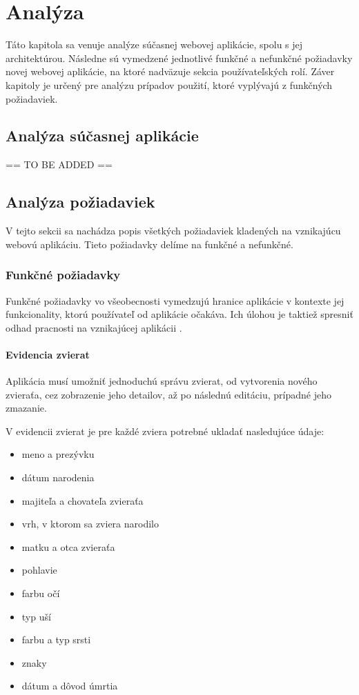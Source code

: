 \chapter{Analýza}
Táto kapitola sa venuje analýze súčasnej webovej aplikácie, spolu s jej architektúrou. Následne sú vymedzené jednotlivé funkčné a nefunkčné požiadavky novej webovej aplikácie, na ktoré nadväzuje sekcia používateľských rolí. Záver kapitoly je určený pre analýzu prípadov použití, ktoré vyplývajú z funkčných požiadaviek.

\section{Analýza súčasnej aplikácie}
== TO BE ADDED ==

\section{Analýza požiadaviek}
V tejto sekcii sa nachádza popis všetkých požiadaviek kladených na vznikajúcu webovú aplikáciu.
Tieto požiadavky delíme na funkčné a nefunkčné.

\subsection{Funkčné požiadavky}\label{funkcne-poziadavky}
Funkčné požiadavky vo všeobecnosti vymedzujú hranice aplikácie v kontexte jej funkcionality, ktorú používateľ od aplikácie očakáva. Ich úlohou je taktiež spresniť odhad pracnosti na vznikajúcej aplikácii \cite{funkcne-a-nefunkcne-poziadavky}.

\subsubsection{Evidencia zvierat}\label{evidencia-zvierat}
Aplikácia musí umožniť jednoduchú správu zvierat, od vytvorenia nového zvieraťa, cez zobrazenie jeho detailov, až po následnú editáciu, prípadné jeho zmazanie.

\hfill \break
V evidencii zvierat je pre každé zviera potrebné ukladať nasledujúce údaje:

\begin{itemize}
	\item meno a prezývku
	\item dátum narodenia
	\item majiteľa a chovateľa zvieraťa
	\item vrh, v ktorom sa zviera narodilo
	\item matku a otca zvieraťa
	\item pohlavie
	\item farbu očí
	\item typ uší
	\item farbu a typ srsti
	\item znaky
	\item dátum a dôvod úmrtia
\end{itemize}

